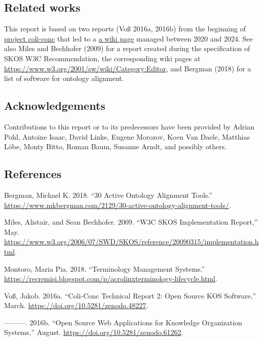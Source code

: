 \documentclass[
  DIV=10]{article}
\newlength{\cslhangindent}
\newenvironment{CSLReferences}[2] %
 {\begin{list}{}{%
  \setlength{\itemindent}{0pt}
  \setlength{\leftmargin}{0pt}
  \setlength{\parsep}{0pt}
  \ifodd #1
   \setlength{\leftmargin}{\cslhangindent}
   \setlength{\itemindent}{-1\cslhangindent}
  \fi
  \setlength{\itemsep}{#2\baselineskip}}}
 {\end{list}}
\begin{document}
\subsection{Related works}\label{related-works}

This report is based on two reports (Voß 2016a, 2016b) from the
beginning of \href{https://coli-conc.gbv.de/}{project coli-conc} that
led to a
\href{https://github.com/gbv/bartoc.org/wiki/Software-for-controlled-vocabularies}{a
wiki page} managed between 2020 and 2024. See also Miles and Bechhofer
(2009) for a report created during the specification of SKOS W3C
Recommendation, the corresponding wiki pages at
\url{https://www.w3.org/2001/sw/wiki/Category:Editor}, and Bergman
(2018) for a list of software for ontology alignment.

\subsection{Acknowledgements}\label{acknowledgements}

Contributions to this report or to its predecessors have been provided
by Adrian Pohl, Antoine Isaac, David Linke, Eugene Morozov, Koen Van
Daele, Matthias Löbe, Monty Bitto, Roman Baum, Susanne Arndt, and
possibly others.

\subsection{References}\label{references}

\label{refs}
\begin{CSLReferences}{1}{0}
Bergman, Michael K. 2018. {``30 Active Ontology Alignment Tools.''}
\url{https://www.mkbergman.com/2129/30-active-ontology-alignment-tools/}.

Miles, Alistair, and Sean Bechhofer. 2009. {``W3C SKOS Implementation
Report,''} May.
\url{https://www.w3.org/2006/07/SWD/SKOS/reference/20090315/implementation.html}.

Montoro, Maria Pia. 2018. {``Terminology Management Systems.''}
\url{https://recremisi.blogspot.com/p/acrolinxterminology-lifecycle.html}.

Voß, Jakob. 2016a. {``Coli-Conc {Technical} {Report} 2: {Open} {Source}
{KOS} Software,''} March. \url{https://doi.org/10.5281/zenodo.48227}.

---------. 2016b. {``Open {Source} Web Applications for {Knowledge}
{Organization} {Systems},''} August.
\url{https://doi.org/10.5281/zenodo.61262}.

\end{CSLReferences}
\end{document}
